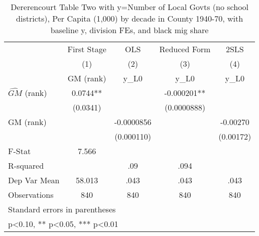 \begin{table}[htbp]\centering
\def\sym#1{\ifmmode^{#1}\else\(^{#1}\)\fi}
\caption{Dererencourt Table Two with y=Number of Local Govts (no school districts), Per Capita (1,000) by decade in County 1940-70, with baseline y, division FEs, and black mig share}
\begin{tabular}{l*{4}{c}}
\toprule
                    & First Stage   &         OLS   &Reduced Form   &        2SLS   \\
                    &\multicolumn{1}{c}{(1)}&\multicolumn{1}{c}{(2)}&\multicolumn{1}{c}{(3)}&\multicolumn{1}{c}{(4)}\\
                    &\multicolumn{1}{c}{GM  (rank)}&\multicolumn{1}{c}{y\_L0}&\multicolumn{1}{c}{y\_L0}&\multicolumn{1}{c}{y\_L0}\\
\midrule
$\hat{GM}$ (rank)   &      0.0744** &               &   -0.000201** &               \\
                    &    (0.0341)   &               & (0.0000888)   &               \\
\addlinespace
GM  (rank)          &               &  -0.0000856   &               &    -0.00270   \\
                    &               &  (0.000110)   &               &   (0.00172)   \\
\midrule
F-Stat              &       7.566   &               &               &               \\
R-squared           &               &         .09   &        .094   &               \\
Dep Var Mean        &      58.013   &        .043   &        .043   &        .043   \\
Observations        &         840   &         840   &         840   &         840   \\
\bottomrule
\multicolumn{5}{l}{\footnotesize Standard errors in parentheses}\\
\multicolumn{5}{l}{\footnotesize * p<0.10, ** p<0.05, *** p<0.01}\\
\end{tabular}
\end{table}
